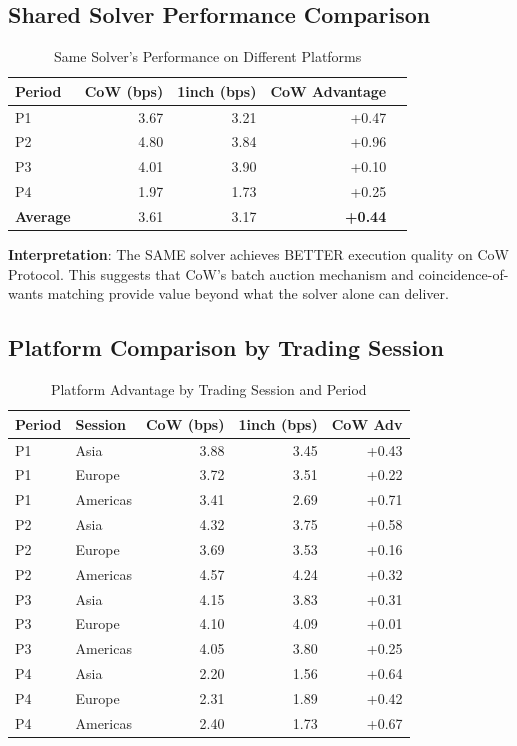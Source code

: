 \documentclass[11pt,a4paper]{article}
\begin{document}
\subsection{Shared Solver Performance Comparison}

\begin{table}[H]
\centering
\caption{Same Solver's Performance on Different Platforms}
\begin{tabular}{lrrrr}
\toprule
\textbf{Period} & \textbf{CoW (bps)} & \textbf{1inch (bps)} & \textbf{CoW Advantage} \\
\midrule
P1 & 3.67 & 3.21 & +0.47 \\
P2 & 4.80 & 3.84 & +0.96 \\
P3 & 4.01 & 3.90 & +0.10 \\
P4 & 1.97 & 1.73 & +0.25 \\
\midrule
\textbf{Average} & 3.61 & 3.17 & \textbf{+0.44} \\
\bottomrule
\end{tabular}
\end{table}

\textbf{Interpretation}: The SAME solver achieves BETTER execution quality on CoW Protocol. This suggests that CoW's batch auction mechanism and coincidence-of-wants matching provide value beyond what the solver alone can deliver.

\subsection{Platform Comparison by Trading Session}

\begin{table}[H]
\centering
\caption{Platform Advantage by Trading Session and Period}
\begin{tabular}{llrrr}
\toprule
\textbf{Period} & \textbf{Session} & \textbf{CoW (bps)} & \textbf{1inch (bps)} & \textbf{CoW Adv} \\
\midrule
P1 & Asia & 3.88 & 3.45 & +0.43 \\
P1 & Europe & 3.72 & 3.51 & +0.22 \\
P1 & Americas & 3.41 & 2.69 & +0.71 \\
P2 & Asia & 4.32 & 3.75 & +0.58 \\
P2 & Europe & 3.69 & 3.53 & +0.16 \\
P2 & Americas & 4.57 & 4.24 & +0.32 \\
P3 & Asia & 4.15 & 3.83 & +0.31 \\
P3 & Europe & 4.10 & 4.09 & +0.01 \\
P3 & Americas & 4.05 & 3.80 & +0.25 \\
P4 & Asia & 2.20 & 1.56 & +0.64 \\
P4 & Europe & 2.31 & 1.89 & +0.42 \\
P4 & Americas & 2.40 & 1.73 & +0.67 \\
\bottomrule
\end{tabular}
\end{table}
\end{document}

